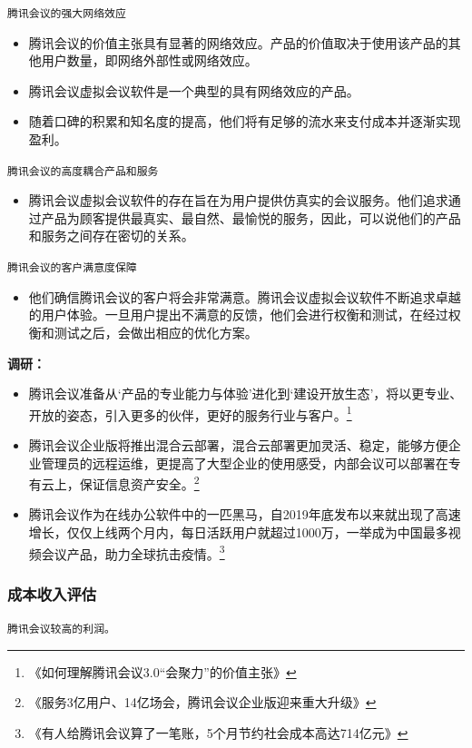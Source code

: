 \documentclass[a4paper,12pt]{article}
\begin{document}
\texttt{腾讯会议的强大网络效应}

\begin{itemize}
  \item 腾讯会议的价值主张具有显著的网络效应。产品的价值取决于使用该产品的其他用户数量，即网络外部性或网络效应。
  
  \item 腾讯会议虚拟会议软件是一个典型的具有网络效应的产品。
  
  \item 随着口碑的积累和知名度的提高，他们将有足够的流水来支付成本并逐渐实现盈利。
  
\end{itemize}

\texttt{腾讯会议的高度耦合产品和服务}

\begin{itemize}
  \item 腾讯会议虚拟会议软件的存在旨在为用户提供仿真实的会议服务。他们追求通过产品为顾客提供最真实、最自然、最愉悦的服务，因此，可以说他们的产品和服务之间存在密切的关系。
\end{itemize}

\texttt{腾讯会议的客户满意度保障}

\begin{itemize}
  \item 他们确信腾讯会议的客户将会非常满意。腾讯会议虚拟会议软件不断追求卓越的用户体验。一旦用户提出不满意的反馈，他们会进行权衡和测试，在经过权衡和测试之后，会做出相应的优化⽅案。
\end{itemize}
\textbf{调研：}
\begin{itemize}
    \item 腾讯会议准备从‘产品的专业能力与体验’进化到‘建设开放生态’，将以更专业、开放的姿态，引入更多的伙伴，更好的服务行业与客户。\footnote{《如何理解腾讯会议3.0“会聚力”的价值主张》}
    \item 腾讯会议企业版将推出混合云部署，混合云部署更加灵活、稳定，能够方便企业管理员的远程运维，更提高了大型企业的使用感受，内部会议可以部署在专有云上，保证信息资产安全。\footnote{《服务3亿用户、14亿场会，腾讯会议企业版迎来重大升级》}
    \item 腾讯会议作为在线办公软件中的一匹黑马，自2019年底发布以来就出现了高速增长，仅仅上线两个月内，每日活跃用户就超过1000万，一举成为中国最多视频会议产品，助力全球抗击疫情。\footnote{《有人给腾讯会议算了一笔账，5个月节约社会成本高达714亿元》}
\end{itemize}
\subsubsection{成本收入评估}
\texttt{腾讯会议较高的利润。}
\end{document}
